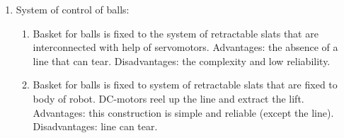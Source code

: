 \begin{enumerate}
\begin{enumerate}
\begin{enumerate}
\begin{enumerate}
	    \end{enumerate}
	    
	    \item System of control of balls:
	    \begin{enumerate}
	      \item Basket for balls is fixed to the system of retractable slats that are interconnected  with help of servomotors. Advantages: the absence of a line that can tear. Disadvantages: the complexity and low reliability.	
	      
	      \item Basket for balls is fixed to system of retractable slats that are fixed to body of robot. DC-motors reel up the line and extract the lift. Advantages: this construction is simple and reliable (except the line). Disadvantages: line can tear.
	      

\end{enumerate}
\end{enumerate}
\end{enumerate}
\end{enumerate}
